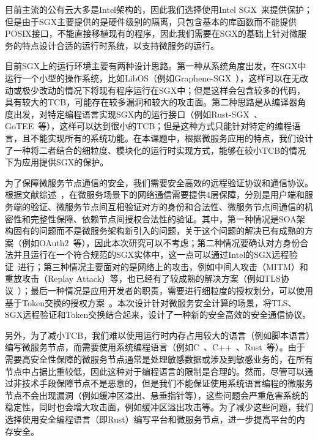 目前主流的公有云大多是Intel架构的，因此我们选择使用Intel SGX~\cite{costan2016intel}来提供保护；但是由于SGX主要提供的是硬件级别的隔离，只包含基本的库函数而不能提供POSIX接口，不能直接移植现有的程序，因此我们需要在SGX的基础上针对微服务的特点设计合适的运行时系统，以支持微服务的运行。

目前SGX上的运行环境主要有两种设计思路。第一种从系统角度出发，在SGX中运行一个小型的操作系统，比如LibOS（例如Graphene-SGX~\cite{tsai2017graphene}），这样可以在无改动或极少改动的情况下将现有程序运行在SGX中；但是这样会包含较多的代码，具有较大的TCB，可能存在较多漏洞和较大的攻击面。第二种思路是从编译器角度出发，对特定编程语言实现SGX内的运行接口（例如Rust-SGX~\cite{wang2019towards}、GoTEE~\cite{ghosn2019secured}等），这样可以达到很小的TCB；但是这种方式只能针对特定的编程语言，且不能实现所有的系统功能。在本课题中，根据微服务应用的特点，我们设计了一种将二者结合的细粒度、模块化的运行时实现方式，能够在较小TCB的情况下为应用提供SGX的保护。

为了保障微服务节点通信的安全，我们需要安全高效的远程验证协议和通信协议。根据文献综述~\cite{Vale2021SecurityIM,Berardi2022MicroserviceSA}，在微服务场景下的网络通信需要提供4层保障，分别是用户端和服务端的验证、微服务节点间互相验证对方的身份和合法性、微服务节点间通信的机密性和完整性保障、依赖节点间授权合法性的验证。其中，第一种情况是SOA架构固有的问题而不是微服务架构新引入的问题，关于这个问题的解决已有成熟的方案（例如OAuth2~\cite{oauth2spec}等），因此本次研究可以不考虑；第二种情况要确认对方身份合法并且运行在一个符合规范的SGX实体中，这一点可以通过Intel的SGX远程验证~\cite{intel-sgx-ra}进行；第三种情况主要面对的是网络上的攻击，例如中间人攻击（MITM）和重放攻击（Replay Attack）等，也已经有了较成熟的解决方案（例如TLS协议~\cite{8446}）；最后一种情况是应用开发者的职责，需要进行细粒度的授权划分，可以使用基于Token交换的授权方案~\cite{rfc8693}。本次设计针对微服务安全计算的场景，将TLS、SGX远程验证和Token交换结合起来，设计了一种新的安全高效的安全通信协议。

另外，为了减小TCB，我们难以使用运行时内存占用较大的语言（例如脚本语言）编写微服务节点，而需要使用系统编程语言（例如C~\cite{kernighan1988c}、C++~\cite{stroustrup2013cpp}、Rust~\cite{rust-lang}等）。由于需要高安全性保障的微服务节点通常是处理敏感数据或涉及到敏感业务的，在所有节点中占据比重较低，因此这种对于编程语言的限制是合理的。然而，尽管可以通过非技术手段保障节点不是恶意的，但是我们不能保证使用系统语言编程的微服务节点不会出现漏洞（例如缓冲区溢出、悬垂指针等），这些问题会严重危害系统的稳定性，同时也会增大攻击面，例如缓冲区溢出攻击等。为了减少这些问题，我们选择使用安全编程语言（即Rust）编写平台和微服务节点，进一步提高平台的内存安全。

